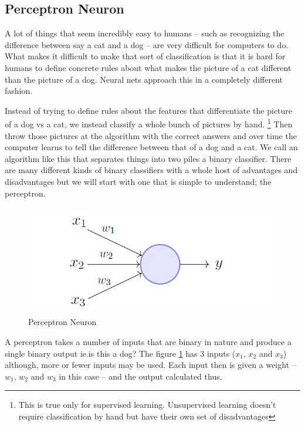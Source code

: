 \subsection{Perceptron Neuron}

A lot of things that seem incredibly easy to humans -- such as  recognizing the difference between say a cat and a dog -- are very difficult for computers to do.
What makes it difficult to make that sort of classification is that it is hard for humans to define concrete rules about what makes the picture of a cat different than the picture of a dog.
Neural nets approach this in a completely different fashion.

Instead of trying to define rules about the features that differentiate the picture of a dog vs a cat, we instead classify a whole bunch of pictures by hand.
\footnote{This is true only for supervised learning.
Unsupervised learning doesn't require classification by hand but have their own set of disadvantages}
Then throw those pictures at the algorithm with the correct answers and over time the computer learns to tell the difference between that of a dog and a cat.
We call an algorithm like this that separates things into two piles a binary classifier.
There are many different kinds of binary classifiers with a whole host of advantages and disadvantages but we will start with one that is simple to understand; the perceptron.

\begin{figure}[H]
  \centering
  \includegraphics[width=120mm]{figures/perceptron1.png}
  \caption{Perceptron Neuron \cite{El-Amir_Hamdy_2019}}
  \label{perceptron1}
\end{figure}

A perceptron takes a number of inputs that are binary in nature and produce a single binary output \cite{Freund_Schapire_1998} ie.is this a dog? The figure \ref{perceptron1} has 3 inputs ($x_1$, $x_2$ and $x_3$) although, more or fewer inputs may be used.
Each input then is given a weight -- $w_1$, $w_2$ and $w_3$ in this case -- and the output calculated thus.

